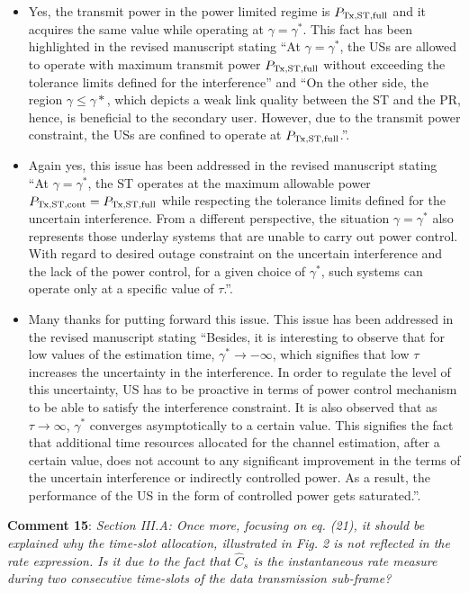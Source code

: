 \documentclass[12pt,a4wide,peerreview]{IEEEtran}
\newcommand{\tc}[1]{#1}
\begin{document}
\begin{itemize}
\item Yes, the transmit power in the power limited regime is $P_{\text{Tx,ST,full}}$ and it acquires the same value while operating at $\gamma = \gamma^*$. This fact has been highlighted in the revised manuscript stating ``At $\gamma = \gamma^*$, the USs are allowed to operate with maximum transmit power $P_{\text{Tx,ST,full}}$ without exceeding the tolerance limits defined for the interference'' and ``On the other side, the region $\gamma \le \gamma*$, which depicts a weak link quality between the ST and the PR, hence, is beneficial to the secondary user. However, due to the transmit power constraint, the USs are confined to operate at $P_{\text{Tx,ST,full}}$.''. 
\item Again yes, this issue has been addressed in the revised manuscript stating ``At $\gamma = \gamma^*$, the ST operates at the maximum allowable power $P_{\text{Tx,ST,cont}} = P_{\text{Tx,ST,full}}$ while respecting the tolerance limits defined for the uncertain interference. From a different perspective, the situation $\gamma = \gamma^*$ also represents those underlay systems that are unable to carry out power control. With regard to desired outage constraint on the uncertain interference and the lack of the power control, for a given choice of $\gamma^*$, such systems can operate only at a specific value of $\tau$.''. 
\item Many thanks for putting forward this issue. This issue has been addressed in the revised manuscript stating ``Besides, it is interesting to observe that for low values of the estimation time, $\gamma^* \rightarrow -\infty$, which signifies that low $\tau$ increases the uncertainty in the interference. In order to regulate the level of this uncertainty, US has to be proactive in terms of power control mechanism to be able to satisfy the interference constraint. It is also observed that as $\tau \rightarrow \infty$, $\gamma^*$ converges asymptotically to a certain value. This signifies the fact that additional time resources allocated for the channel estimation, after a certain value, does not account to any significant improvement in the terms of the uncertain interference or indirectly controlled power. As a result, the performance of the US in the form of controlled power gets saturated.''.
\end{itemize}
\textbf{\tc{Comment 15}}: 
\textit{
Section III.A: Once more, focusing on eq. (21), it should be explained why the time-slot allocation, illustrated in Fig. 2 is not reflected in the rate expression. Is it due to the fact that $\hat{C}_s$ is the instantaneous rate measure during two consecutive time-slots of the data transmission sub-frame?
}
\end{document}
